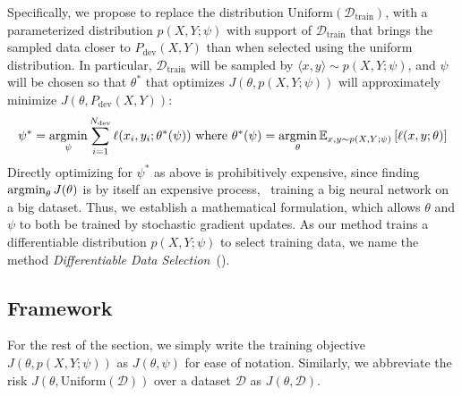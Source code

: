 
Specifically, we propose to replace the distribution $\text{Uniform}(\mathcal{D}_\text{train})$, with a parameterized distribution $p(X, Y; \psi)$ with support of $\mathcal{D}_\text{train}$ that brings the sampled data closer to $P_\text{dev}(X, Y)$ than when selected using the uniform distribution. In particular, $\mathcal{D}_\text{train}$ will be sampled by $\langle x, y \rangle \sim p(X, Y; \psi)$, 
and $\psi$ will be chosen so that $\theta^*$ that optimizes $J(\theta, p(X, Y;\psi))$ will approximately minimize $J(\theta, P_\text{dev}(X,Y))$: 
\begin{equation}
  \label{eqn:psi_theta_argmin}
  \begin{aligned}
    \psi^* = \operatorname*{argmin}_\psi
    \sum_{i=1}^{N_\text{dev}} \ell(x_i, y_i; \theta^*(\psi))
    ~\text{where}~
    \theta^*(\psi) = \operatorname*{argmin}_\theta \mathbb{E}_{x, y \sim p(X, Y; \psi)} \left[ \ell(x, y; \theta) \right]
  \end{aligned}
\end{equation}
Directly optimizing for $\psi^*$ as above is prohibitively expensive, since finding $\operatorname*{argmin}_\theta J(\theta)$ is by itself an expensive process, \eg~training a big neural network on a big dataset. 
Thus, we establish a mathematical formulation, which allows $\theta$ and $\psi$ to both be trained by stochastic gradient updates. As our method trains a differentiable distribution $p(X, Y; \psi)$ to select training data, we name the method \textit{Differentiable Data Selection}~(\dds).

\subsection{\label{sec:diff_data_selection}Framework}
For the rest of the section, we simply write the training objective $J(\theta, p(X, Y;\psi))$ as $J(\theta, \psi)$ for ease of notation. Similarly, we abbreviate the risk $J(\theta, \text{Uniform}(\mathcal{D}))$ over a dataset $\mathcal{D}$ as $J(\theta, \mathcal{D})$.

